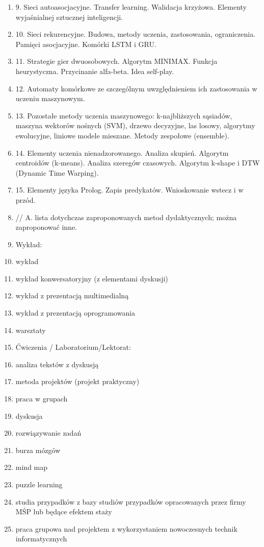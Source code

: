 \documentclass[12pt, a4paper]{article}
\begin{document}
\begin{enumerate}
  \item 9. Sieci autoasocjacyjne. Transfer learning. Walidacja krzyżowa. Elementy wyjaśnialnej sztucznej inteligencji.
  \item 10. Sieci rekurencyjne. Budowa, metody uczenia, zastosowania, ograniczenia. Pamięci asocjacyjne. Komórki LSTM i GRU.
  \item 11. Strategie gier dwuosobowych. Algorytm MINIMAX.  Funkcja heurystyczna. Przycinanie alfa-beta. Idea self-play.
  \item 12. Automaty komórkowe ze szczególnym uwzględnieniem ich zastosowania w uczeniu maszynowym.
  \item 13. Pozostałe metody uczenia maszynowego: k-najbliższych sąsiadów, maszyna wektorów nośnych (SVM), drzewo decyzyjne, las losowy, algorytmy ewolucyjne, liniowe modele mieszane. Metody zespołowe (ensemble).
  \item 14. Elementy uczenia nienadzorowanego. Analiza skupień. Algorytm centroidów (k-means). Analiza szeregów czasowych. Algorytm k-shape i DTW (Dynamic Time Warping).
  \item 15. Elementy języka Prolog. Zapis predykatów. Wnioskowanie wstecz i w przód.
  \item // A. lista dotychczas zaproponowanych metod dydaktycznych; można zaproponować inne.
  \item Wykład:
  \item wykład
  \item wykład konwersatoryjny (z elementami dyskusji)
  \item wykład z prezentacją multimedialną
  \item wykład z prezentacją oprogramowania
  \item warsztaty
  \item Ćwiczenia / Laboratorium/Lektorat:
  \item analiza tekstów z dyskusją
  \item metoda projektów (projekt praktyczny)
  \item praca w grupach
  \item dyskusja
  \item rozwiązywanie zadań
  \item burza mózgów
  \item mind map
  \item puzzle learning
  \item studia przypadków z bazy studiów przypadków opracowanych przez firmy MŚP lub będące efektem staży
  \item praca grupowa nad projektem z wykorzystaniem nowoczesnych technik informatycznych

\end{enumerate}
\end{document}
